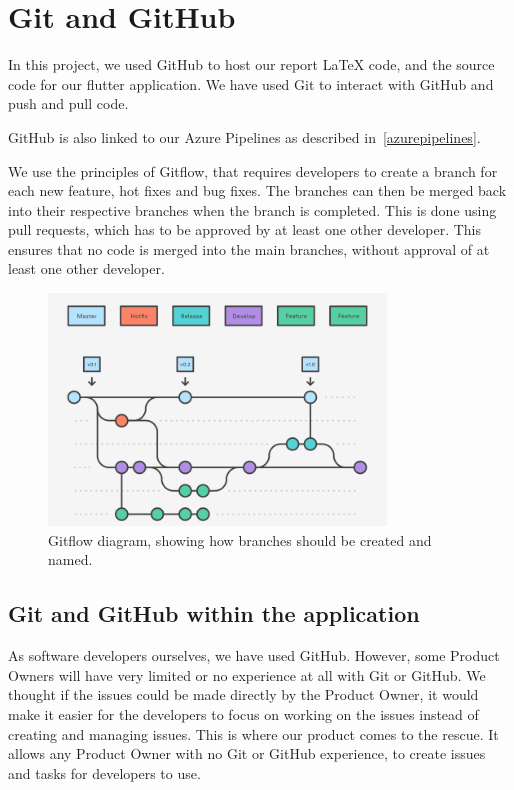 \section{Git and GitHub}
In this project, we used GitHub to host our report LaTeX code, and the source code for our flutter application.
We have used Git to interact with GitHub and push and pull code. 

GitHub is also linked to our Azure Pipelines as described in~\autoref{azurepipelines}.

We use the principles of Gitflow, that requires developers to create a branch for each new feature, hot fixes and bug fixes. 
The branches can then be merged back into their respective branches when the branch is completed.
This is done using pull requests, which has to be approved by at least one other developer.
This ensures that no code is merged into the main branches, without approval of at least one other developer.

\begin{figure}[H]
    \centering
    \includegraphics[width=0.8\textwidth]{images/GitFlow.png}
    \caption{Gitflow diagram, showing how branches should be created and named.}
    \label{Gitflow}
\end{figure}

\subsection{Git and GitHub within the application}
As software developers ourselves, we have used GitHub.
However, some Product Owners will have very limited or no experience at all with Git or GitHub.
We thought if the issues could be made directly by the Product Owner, it would make it easier for the developers to focus on working on the issues instead of creating and managing issues. 
This is where our product comes to the rescue.
It allows any Product Owner with no Git or GitHub experience, to create issues and tasks for developers to use.

